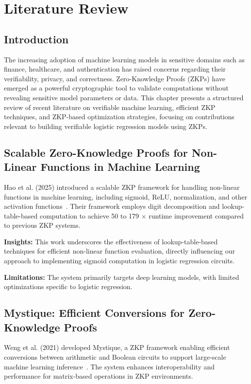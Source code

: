 \chapter{Literature Review}

\section{Introduction}

The increasing adoption of machine learning models in sensitive domains such as finance, healthcare, and authentication has raised concerns regarding their verifiability, privacy, and correctness. Zero-Knowledge Proofs (ZKPs) have emerged as a powerful cryptographic tool to validate computations without revealing sensitive model parameters or data. This chapter presents a structured review of recent literature on verifiable machine learning, efficient ZKP techniques, and ZKP-based optimization strategies, focusing on contributions relevant to building verifiable logistic regression models using ZKPs.

\section{Scalable Zero-Knowledge Proofs for Non-Linear Functions in Machine Learning}

Hao et al. (2025) introduced a scalable ZKP framework for handling non-linear functions in machine learning, including sigmoid, ReLU, normalization, and other activation functions~\cite{cryptoeprint:2025/507}.  
Their framework employs digit decomposition and lookup-table-based computation to achieve 50 to 179 $\times$ runtime improvement compared to previous ZKP systems.

\textbf{Insights:}  
This work underscores the effectiveness of lookup-table-based techniques for efficient non-linear function evaluation, directly influencing our approach to implementing sigmoid computation in logistic regression circuits.

\textbf{Limitations:}  
The system primarily targets deep learning models, with limited optimizations specific to logistic regression.

\section{Mystique: Efficient Conversions for Zero-Knowledge Proofs}

Weng et al. (2021) developed Mystique, a ZKP framework enabling efficient conversions between arithmetic and Boolean circuits to support large-scale machine learning inference~\cite{cryptoeprint:2021/730}.  
The system enhances interoperability and performance for matrix-based operations in ZKP environments.

